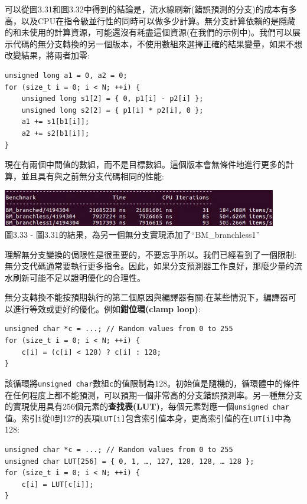 可以從圖3.31和圖3.32中得到的結論是，流水線刷新(錯誤預測的分支)的成本有多高，以及CPU在指令級並行性的同時可以做多少計算。無分支計算依賴的是隱藏的和未使用的計算資源，可能還沒有耗盡這個資源(在我們的示例中)。我們可以展示代碼的無分支轉換的另一個版本，不使用數組來選擇正確的結果變量，如果不想改變結果，將兩者加零:

\begin{lstlisting}[style=styleCXX]
unsigned long a1 = 0, a2 = 0;
for (size_t i = 0; i < N; ++i) {
	unsigned long s1[2] = { 0, p1[i] - p2[i] };
	unsigned long s2[2] = { p1[i] * p2[i], 0 };
	a1 += s1[b1[i]];
	a2 += s2[b1[i]];
}
\end{lstlisting}

現在有兩個中間值的數組，而不是目標數組。這個版本會無條件地進行更多的計算，並且具有與之前無分支代碼相同的性能:

\begin{center}
\includegraphics[width=0.9\textwidth]{content/1/chapter3/images/33.jpg}\\
圖3.33 - 圖3.31的結果，為另一個無分支實現添加了“BM\_branchless1”
\end{center}

理解無分支變換的侷限性是很重要的，不要忘乎所以。我們已經看到了一個限制:無分支代碼通常要執行更多指令。因此，如果分支預測器工作良好，那麼少量的流水刷新可能不足以證明優化的合理性。

無分支轉換不能按預期執行的第二個原因與編譯器有關:在某些情況下，編譯器可以進行等效或更好的優化。例如\textbf{鉗位環(clamp loop)}:

\begin{lstlisting}[style=styleCXX]
unsigned char *c = ...; // Random values from 0 to 255
for (size_t i = 0; i < N; ++i) {
	c[i] = (c[i] < 128) ? c[i] : 128;
}
\end{lstlisting}

該循環將\texttt{unsigned char}數組\texttt{c}的值限制為128。初始值是隨機的，循環體中的條件在任何程度上都不能預測，可以預期一個非常高的分支錯誤預測率。另一種無分支的實現使用具有256個元素的\textbf{查找表(LUT)}，每個元素對應一個\texttt{unsigned char}值。索引\texttt{i}從0到127的表項\texttt{LUT[i]}包含索引值本身，更高索引值的在\texttt{LUT[i]}中為128:

\begin{lstlisting}[style=styleCXX]
unsigned char *c = ...; // Random values from 0 to 255
unsigned char LUT[256] = { 0, 1, …, 127, 128, 128, … 128 };
for (size_t i = 0; i < N; ++i) {
	c[i] = LUT[c[i]];
}
\end{lstlisting}

